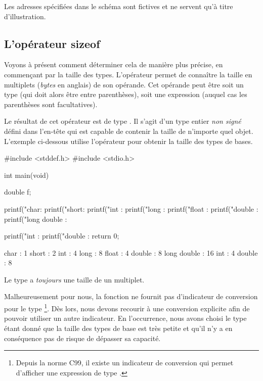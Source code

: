 \begin{infobox}
Les adresses spécifiées dans le schéma sont fictives et 
ne servent qu'à titre d'illustration.
\end{infobox}


\subsection{L'opérateur sizeof}
\label{loperateur-sizeof}

Voyons à présent comment déterminer cela de manière plus précise, en
commençant par la taille des types. L'opérateur  permet
de connaître la taille en multiplets (\emph{bytes} en anglais) de son
opérande. Cet opérande peut être soit un type (qui doit alors être entre
parenthèses), soit une expression (auquel cas les parenthèses sont
facultatives).

Le résultat de cet opérateur est de type . Il s'agit
d'un type entier \emph{non signé} défini dans l'en-tête
 qui est capable de contenir
la taille de n'importe quel objet. L'exemple ci-dessous utilise
l'opérateur  pour obtenir la taille des types de bases.

\begin{C}
#include <stddef.h>
#include <stdio.h>


int main(void)
{
    double f;

    printf("char: %
    printf("short: %
    printf("int : %
    printf("long : %
    printf("float : %
    printf("double : %
    printf("long double : %

    printf("int : %
    printf("double : %
    return 0;
}
\end{C}

\begin{C}
char : 1
short : 2
int : 4
long : 8
float : 4
double : 8
long double : 16
int : 4
double : 8
\end{C}

\begin{infobox}
Le type  a \emph{toujours} une taille de un multiplet.
\end{infobox}


Malheureusement pour nous, la fonction  ne fournit pas
d'indicateur de conversion pour le type \footnote{Depuis
la norme C99, il existe un indicateur de conversion  qui
permet d'afficher une expression de type .}. Dès lors,
nous devons recourir à une conversion explicite afin de pouvoir utiliser
un autre indicateur. En l'occurrence, nous avons choisi le type
 étant donné que la taille des types de base est
très petite et qu'il n'y a en conséquence pas de risque de dépasser sa
capacité.

